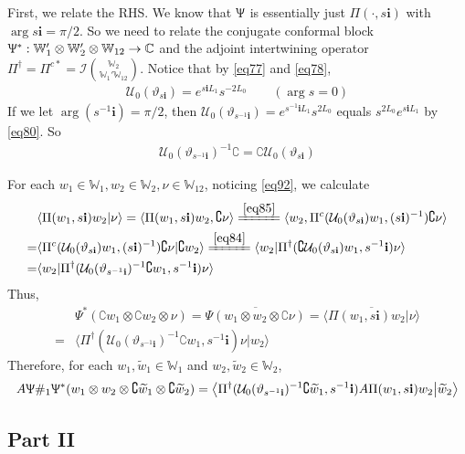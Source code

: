 \documentclass[11pt,b5paper,notitlepage]{article}
\theoremstyle{definition}
\theoremstyle{plain}
\newcommand{\mc}{\mathcal}
\newcommand{\wtd}{\widetilde}
\newcommand{\ovl}{\overline}
\newcommand{\bk}[1]{\langle {#1}\rangle}
\newcommand{\bigbk}[1]{\big\langle {#1}\big\rangle}
\newcommand{\im}{\mathbf{i}}
\newcommand{\Co}{\complement}
\newcommand{\Wbb}{\mathbb W}
\newcommand{\Cbb}{\mathbb C}
\numberwithin{equation}{section}
\begin{document}
First, we relate the RHS. We know that $\Uppsi$ is essentially just $\Pi(\cdot,s\im)$ with $\arg s\im=\pi/2$. So we need to relate the conjugate conformal block $\Uppsi^*:\Wbb_1'\otimes\Wbb_2'\otimes\Wbb_{12}\rightarrow\Cbb$ and the adjoint intertwining operator $\Pi^\dagger=\Pi^{c*}=\mc I{\Wbb_2\choose \Wbb_1'\Wbb_{12}}$. Notice that by \eqref{eq77} and \eqref{eq78},
\begin{align*}
\mc U_0(\vartheta_{s\im})=e^{s\im L_1}s^{-2L_0}\qquad(\arg s=0)
\end{align*} 
If we let $\arg(s^{-1}\im)=\pi/2$, then $\mc U_0(\vartheta_{s^{-1}\im})=e^{s^{-1}\im L_1}s^{2L_0}$ equals $s^{2L_0}e^{s\im L_1}$ by \eqref{eq80}. So
\begin{align*}
\mc U_0(\vartheta_{s^{-1}\im})^{-1}\Co=\Co \mc U_0(\vartheta_{s\im})
\end{align*}


For each $w_1\in\Wbb_1,w_2\in\Wbb_2,\nu\in\Wbb_{12}$, noticing \eqref{eq92}, we calculate
\begin{align}
&\bk{\Pi(w_1,s\im)w_2|\nu}=\bk{\Pi(w_1,s\im)w_2,\Co \nu}\xlongequal{\eqref{eq85}}\bk{w_2,\Pi^c(\mc U_0(\vartheta_{s\im})w_1,(s\im)^{-1})\Co \nu}\nonumber\\
=&\bk{\Pi^c(\mc U_0(\vartheta_{s\im})w_1,(s\im)^{-1})\Co \nu|\Co w_2}\xlongequal{\eqref{eq84}}\bk{w_2|\Pi^\dagger(\Co\mc U_0(\vartheta_{s\im}) w_1,s^{-1}\im)\nu}\nonumber\\
=&\bk{w_2|\Pi^\dagger(\mc U_0(\vartheta_{s^{-1}\im})^{-1} \Co w_1,s^{-1}\im)\nu}
\end{align}
Thus,
\begin{align*}
&\Psi^*(\Co w_1\otimes\Co w_2\otimes \nu)=\ovl{\Psi(w_1\otimes w_2\otimes \Co\nu)}=\ovl{\bk{\Pi(w_1,s\im)w_2|\nu}}\\
=&\bk{\Pi^\dagger(\mc U_0(\vartheta_{s^{-1}\im})^{-1} \Co w_1,s^{-1}\im)\nu|w_2}
\end{align*}
Therefore, for each $w_1,\wtd w_1\in\Wbb_1$ and $w_2,\wtd w_2\in\Wbb_2$,
\begin{align}
A\Uppsi\#_1\Uppsi^*(w_1\otimes w_2\otimes\Co\wtd w_1\otimes\Co\wtd w_2)=\bigbk{\Pi^\dagger(\mc U_0(\vartheta_{s^{-1}\im})^{-1} \Co \wtd w_1,s^{-1}\im) A\Pi(w_1,s\im)w_2\big|\wtd w_2}  \label{eq87}
\end{align}



\subsection{Part II}
\end{document}
